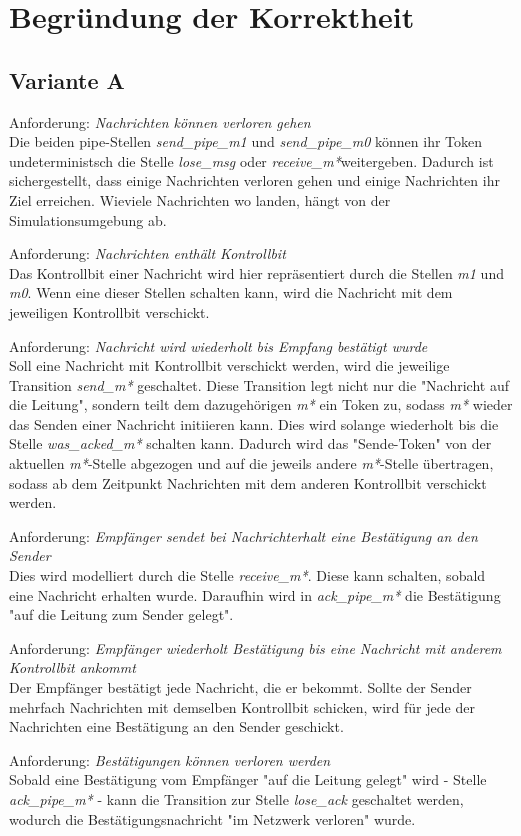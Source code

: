 \documentclass[]{scrartcl}
\begin{document}
\section{Begründung der Korrektheit}
\subsection{Variante A}
Anforderung: \textit{Nachrichten können verloren gehen} \\
Die beiden pipe-Stellen \textit{send\_pipe\_m1} und \textit{send\_pipe\_m0} können ihr Token undeterministsch die Stelle \textit{lose\_msg} oder \textit{receive\_m*}weitergeben. Dadurch ist sichergestellt, dass einige Nachrichten verloren gehen und einige Nachrichten ihr Ziel erreichen. Wieviele Nachrichten wo landen, hängt von der Simulationsumgebung ab.

Anforderung: \textit{Nachrichten enthält Kontrollbit} \\
Das Kontrollbit einer Nachricht wird hier repräsentiert durch die Stellen \textit{m1} und \textit{m0}. Wenn eine dieser Stellen schalten kann, wird die Nachricht mit dem jeweiligen Kontrollbit verschickt.

Anforderung: \textit{Nachricht wird wiederholt bis Empfang bestätigt wurde} \\
Soll eine Nachricht mit Kontrollbit verschickt werden, wird die jeweilige Transition \textit{send\_m*} geschaltet. Diese Transition legt nicht nur die "Nachricht auf die Leitung", sondern teilt dem dazugehörigen \textit{m*} ein Token zu, sodass \textit{m*} wieder das Senden einer Nachricht initiieren kann. Dies wird solange wiederholt bis die Stelle \textit{was\_acked\_m*} schalten kann. Dadurch wird das "Sende-Token" von der aktuellen \textit{m*}-Stelle abgezogen und auf die jeweils andere \textit{m*}-Stelle übertragen, sodass ab dem Zeitpunkt Nachrichten mit dem anderen Kontrollbit verschickt werden.

Anforderung: \textit{Empfänger sendet bei Nachrichterhalt eine Bestätigung an den Sender} \\
Dies wird modelliert durch die Stelle \textit{receive\_m*}. Diese kann schalten, sobald eine Nachricht erhalten wurde. Daraufhin wird in \textit{ack\_pipe\_m*} die Bestätigung "auf die Leitung zum Sender gelegt".

Anforderung: \textit{Empfänger wiederholt Bestätigung bis eine Nachricht mit anderem Kontrollbit ankommt} \\
Der Empfänger bestätigt jede Nachricht, die er bekommt. Sollte der Sender mehrfach Nachrichten mit demselben Kontrollbit schicken, wird für jede der Nachrichten eine Bestätigung an den Sender geschickt.

Anforderung: \textit{Bestätigungen können verloren werden} \\
Sobald eine Bestätigung vom Empfänger "auf die Leitung gelegt" wird - Stelle \textit{ack\_pipe\_m*} - kann die Transition zur Stelle \textit{lose\_ack} geschaltet werden, wodurch die Bestätigungsnachricht "im Netzwerk verloren" wurde.
\end{document}

